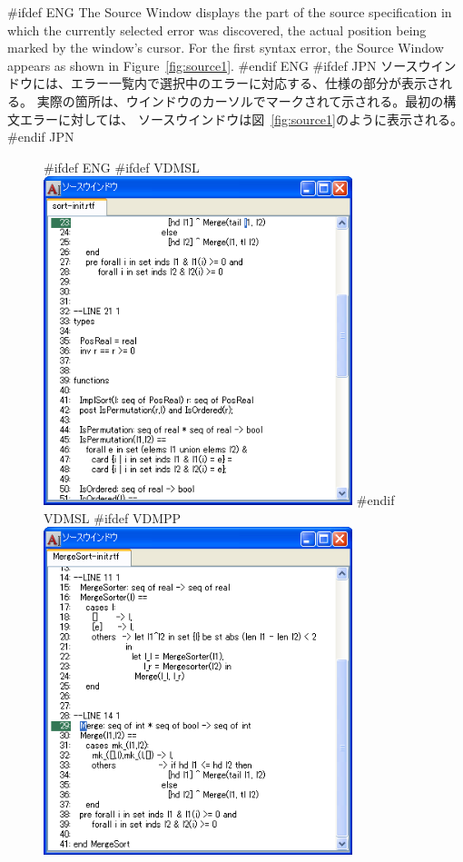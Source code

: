 \documentclass[\pformat,12pt]{article}
\newcommand{\guicmd}[1]{{\sf #1}}
\newcommand{\guicmd}[1]{{\gt #1}}
\begin{document}
#ifdef ENG
The \guicmd{Source Window} displays the part of the source
specification in which the currently selected error was discovered,
the actual position being marked by the window's cursor. For the first
syntax error, the \guicmd{Source Window} appears as shown in
Figure~\ref{fig:source1}.
#endif ENG
#ifdef JPN
\guicmd{ソースウインドウ}には、エラー一覧内で選択中のエラーに対応する、仕様の部分が表示される。
実際の箇所は、ウインドウのカーソルでマークされて示される。最初の構文エラーに対しては、
\guicmd{ソースウインドウ}は図~\ref{fig:source1}のように表示される。
#endif JPN

\begin{figure}[tbh]
\begin{center}
#ifdef ENG
#ifdef VDMSL
\includegraphics[width=9cm]{sourceWindow-sl.png}
#endif VDMSL
#ifdef VDMPP
\includegraphics[width=9cm]{sourceWindow-pp.png}

\end{center}
\end{figure}
\end{document}

